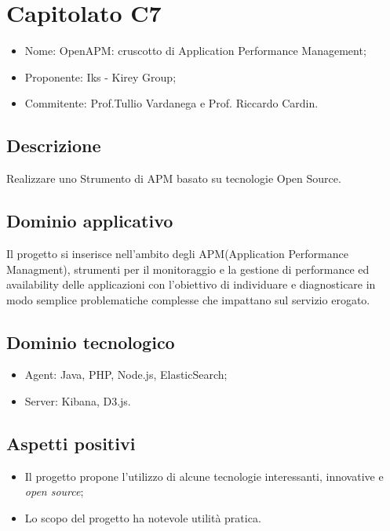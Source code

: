 \documentclass[openany,12pt,a4paper]{report}
\begin{document}

\section{Capitolato C7}

\begin{itemize}
    \item{Nome:} OpenAPM: cruscotto di Application Performance Management;
    \item{Proponente:} Iks - Kirey Group;
    \item{Commitente:} Prof.Tullio Vardanega e Prof. Riccardo Cardin.
\end{itemize}

\subsection{Descrizione}

Realizzare uno Strumento di APM basato su tecnologie Open Source.

\subsection{Dominio applicativo}

Il progetto si inserisce nell'ambito degli APM(Application Performance Managment), strumenti per il monitoraggio e la gestione di performance ed availability delle applicazioni con l’obiettivo di individuare e diagnosticare in modo semplice problematiche complesse che impattano sul servizio erogato.

\subsection{Dominio tecnologico}

\begin{itemize}
    \item{Agent:} Java, PHP, Node.js, ElasticSearch;
    
    \item{Server:} Kibana, D3.js.
\end{itemize}

\subsection{Aspetti positivi}

\begin{itemize}
    \item Il progetto propone l'utilizzo di alcune tecnologie interessanti, innovative e \textit{open source};
    
    \item Lo scopo del progetto ha notevole utilità pratica.
\end{itemize}
\end{document}
